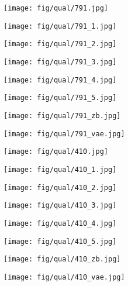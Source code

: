 \documentclass[10pt,twocolumn,letterpaper]{article}
\newcommand{\sze}{0.13}
\newcommand{\szle}{0.08}
\begin{document}
\begin{figure*}[h]
\begin{subfigure}[c]{\sze\linewidth}
\texttt{[image: fig/qual/791.jpg]}
\end{subfigure}
\begin{subfigure}[c]{\sze\linewidth}
\texttt{[image: fig/qual/791\_1.jpg]}
\end{subfigure}
\begin{subfigure}[c]{\sze\linewidth}
\texttt{[image: fig/qual/791\_2.jpg]}
\end{subfigure}
\begin{subfigure}[c]{\sze\linewidth}
\texttt{[image: fig/qual/791\_3.jpg]}
\end{subfigure}
\begin{subfigure}[c]{\sze\linewidth}
\texttt{[image: fig/qual/791\_4.jpg]}
\end{subfigure}
\hspace{3pt}
\begin{subfigure}[c]{\sze\linewidth}
\texttt{[image: fig/qual/791\_5.jpg]}
\end{subfigure}
\begin{subfigure}[c]{\szle\linewidth}
\texttt{[image: fig/qual/791\_zb.jpg]}
\end{subfigure}
\hspace{3pt}
\begin{subfigure}[c]{\szle\linewidth}
\texttt{[image: fig/qual/791\_vae.jpg]}
\end{subfigure}

\begin{subfigure}[c]{\sze\linewidth}
\texttt{[image: fig/qual/410.jpg]}
\end{subfigure}
\begin{subfigure}[c]{\sze\linewidth}
\texttt{[image: fig/qual/410\_1.jpg]}
\end{subfigure}
\begin{subfigure}[c]{\sze\linewidth}
\texttt{[image: fig/qual/410\_2.jpg]}
\end{subfigure}
\begin{subfigure}[c]{\sze\linewidth}
\texttt{[image: fig/qual/410\_3.jpg]}
\end{subfigure}
\begin{subfigure}[c]{\sze\linewidth}
\texttt{[image: fig/qual/410\_4.jpg]}
\end{subfigure}
\hspace{3pt}
\begin{subfigure}[c]{\sze\linewidth}
\texttt{[image: fig/qual/410\_5.jpg]}
\end{subfigure}
\begin{subfigure}[c]{\szle\linewidth}
\texttt{[image: fig/qual/410\_zb.jpg]}
\end{subfigure}
\hspace{3pt}
\begin{subfigure}[c]{\szle\linewidth}
\texttt{[image: fig/qual/410\_vae.jpg]}
\end{subfigure}


\end{figure*}
\end{document}
